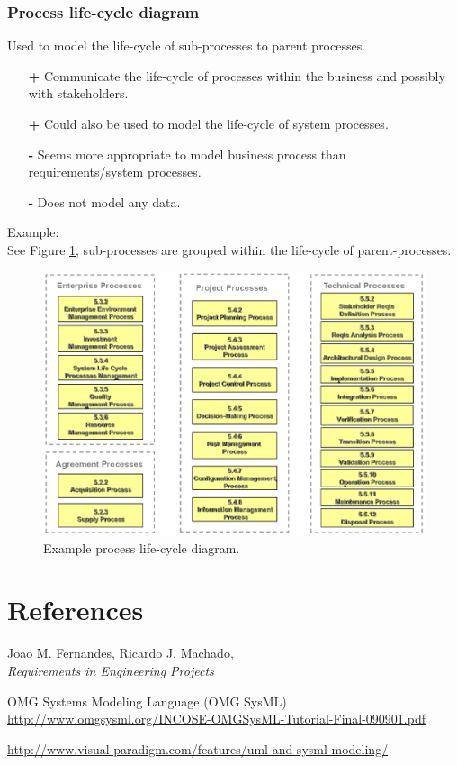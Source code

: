 \clearpage
\subsection*{Process life-cycle diagram \cite{sysml}}
Used to model the life-cycle of sub-processes to parent processes.
\begin{itemize}
	\item[\textbf{+}] Communicate the life-cycle of processes within the business and possibly with stakeholders.
	\item[\textbf{+}] Could also be used to model the life-cycle of system processes.
	\item[\textbf{-}] Seems more appropriate to model business process than requirements/system processes.
	\item[\textbf{-}] Does not model any data.
\end{itemize}

Example:\\
See Figure \ref{fig:lifecycle_diagram}, sub-processes are grouped within the life-cycle of parent-processes.
\begin{figure}[h]
	\centering
	\includegraphics[width=1\linewidth]{Resources/4_lifecycle_diagram.png}
	\caption{Example process life-cycle diagram.}
	\label{fig:lifecycle_diagram}
\end{figure} 


\chapter{References}

\begin{thebibliography}{9}
	
	Joao M. Fernandes, Ricardo J. Machado, \\
	\emph{Requirements in Engineering Projects}
	
	OMG Systems Modeling Language (OMG SysML) \\
	\url{http://www.omgsysml.org/INCOSE-OMGSysML-Tutorial-Final-090901.pdf}
	
	\url{http://www.visual-paradigm.com/features/uml-and-sysml-modeling/}
	
\end{thebibliography}


\appendix



